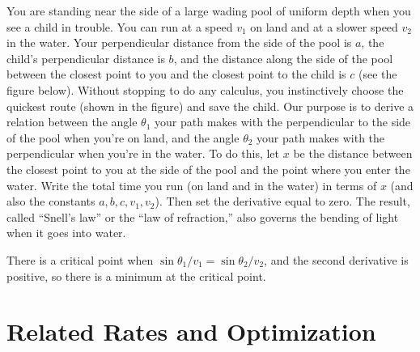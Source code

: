 \begin{exercises}
\begin{exercise}
You are standing near the side of a large wading pool of uniform depth when
you see a child in trouble.  You can run at a speed $v_1$ on land and at a
slower speed $v_2$ in the water.  Your perpendicular distance from the side
of the pool is $a$, the child's perpendicular distance is $b$, and the
distance along the side of the pool between the closest point to you and
the closest point to the child is $c$ (see the figure below). 
Without stopping to do any calculus, you instinctively choose the
quickest route (shown in the figure) and save the child.  Our
purpose is to derive a relation between the angle $\theta_1$ your path
makes with the perpendicular to the side of the pool when you're on land,
and the angle $\theta_2$ your path makes with the perpendicular when you're
in the water.  To do this, let $x$ be the distance between the closest
point to you at the side of the pool and the point where you enter the
water.  Write the total time you run (on land and in the water) in 
terms of $x$ (and also the constants $a,b,c,v_1,v_2$).  Then set the
derivative equal to zero.  The result, called ``Snell's law'' or the ``law
of refraction,'' also governs the bending of light when it goes into water.
\begin{answer} There is a critical point when
$\sin\theta_1/v_1=\sin\theta_2/v_2$, and the second derivative is
positive, so there is a minimum at the critical point.
\end{answer}\end{exercise}


\end{exercises}













\section{Related Rates and Optimization}

